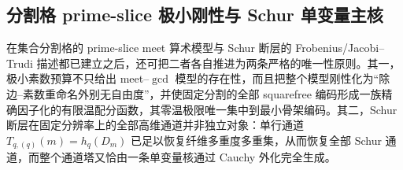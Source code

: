 \subsection{分割格 prime-slice 极小刚性与 Schur 单变量主核}\label{subsec:conclusion-partition-primeslice-schur-singlekernel}
在集合分割格的 prime-slice meet 算术模型与 Schur 断层的 Frobenius/Jacobi--Trudi 描述都已建立之后，还可把二者各自推进为两条严格的唯一性原则。其一，极小素数预算不只给出 meet--\(\gcd\) 模型的存在性，而且把整个模型刚性化为“除边--素数重命名外别无自由度”，并使固定分割的全部 squarefree 编码形成一族精确因子化的有限温配分函数，其零温极限唯一集中到最小骨架编码。其二，Schur 断层在固定分辨率上的全部高维通道并非独立对象：单行通道 \(T_{q,(q)}(m)=h_q(D_m)\) 已足以恢复纤维多重度多重集，从而恢复全部 Schur 通道，而整个通道塔又恰由一条单变量核通过 Cauchy 外化完全生成。

